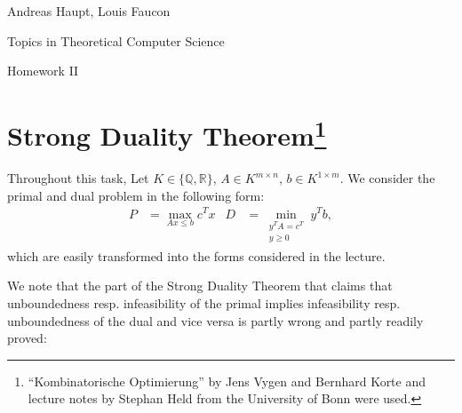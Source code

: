 \documentclass{scrartcl}
\newcommand\1{\mathbf{1}}
\begin{document}
Andreas Haupt, Louis Faucon

Topics in Theoretical Computer Science 

Homework II


\section{Strong Duality Theorem\protect\footnote{\enquote{Kombinatorische Optimierung} by Jens Vygen and Bernhard Korte and lecture notes by Stephan Held from the University of Bonn were used.}}
Throughout this task, Let $K \in \{\mathbb{Q}, \mathbb{R}\}$, $A \in K^{m\times n}$, $b \in K^{1 \times m}$. We consider the primal and dual problem in the following form: 
\begin{align*}
P &= \max_{Ax \le b} c^T x & D &= \min_{\substack{y^T A = c^T\\y \ge 0}} y^T b,
\end{align*}
which are easily transformed into the forms considered in the lecture.

We note that the part of the Strong Duality Theorem that claims that unboundedness resp. infeasibility of the primal implies infeasibility resp. unboundedness of the dual and vice versa is partly wrong and partly readily proved: 
\end{document}
